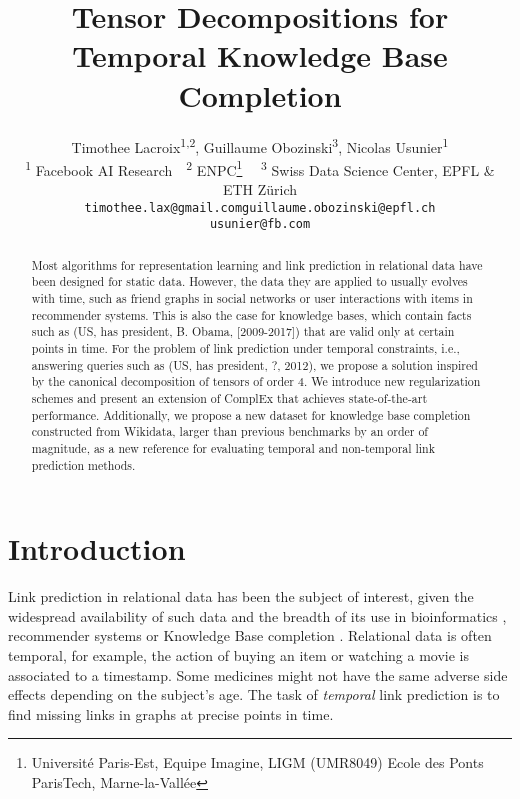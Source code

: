 \documentclass{article}
\title{Tensor Decompositions for\\ Temporal \mbox{Knowledge} Base Completion}
\author{
Timothee Lacroix\textsuperscript{1,2}, Guillaume Obozinski\textsuperscript{3}, Nicolas Usunier\textsuperscript{1} \\
\textsuperscript{1} Facebook AI Research~~\textsuperscript{2} ENPC\thanks{Université Paris-Est, Equipe Imagine, LIGM (UMR8049) Ecole des Ponts ParisTech, Marne-la-Vallée}~~
\textsuperscript{3} Swiss Data Science Center, EPFL \& ETH Zürich\\
\texttt{timothee.lax@gmail.com}\quad\texttt{guillaume.obozinski@epfl.ch}\\
\texttt{usunier@fb.com}\\
}
\begin{document}
\maketitle

\begin{abstract}




    Most algorithms for representation learning and link prediction in relational data have been designed for static data. However, the data they are applied to usually evolves with time, such as friend graphs in social networks or user interactions with items in recommender systems. This is also the case for knowledge bases, which contain facts such as (US, has president, B. Obama, [2009-2017]) that are valid only at certain points in time. For the problem of link prediction under temporal constraints, i.e., answering queries such as (US, has president, ?, 2012), we propose a solution inspired by the canonical decomposition of tensors of order $4$.  
    We introduce new regularization schemes and present an extension of ComplEx \citep{trouillon_complex_2016} that achieves state-of-the-art performance. Additionally, we propose a new dataset for knowledge base completion constructed from Wikidata, larger than previous benchmarks by an order of magnitude, as a new reference for evaluating temporal and non-temporal link prediction methods. 
\end{abstract}





\section{Introduction}
Link prediction in relational data has been the subject of interest, given the widespread availability of such data and the breadth of its use in bioinformatics \citep{Zitnik2018}, recommender systems \citep{koren_matrix_2009} or Knowledge Base completion \citep{nickel_review_2016}. Relational data is often temporal, for example, the action of buying an item or watching a movie is associated to a timestamp. Some medicines might not have the same adverse side effects depending on the subject's age. The task of \emph{temporal} link prediction is to find missing links in graphs at precise points in time.
\end{document}
